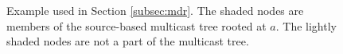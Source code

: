 \begin{figure}[t]
  \begin{center}
  \end{center}
\caption{Example used in Section \ref{subsec:mdr}.  The shaded nodes are members of the source-based multicast tree rooted at $a$.  The lightly shaded nodes are not a part of the multicast tree.}
\label{fig:intuition-example}
\end{figure}


